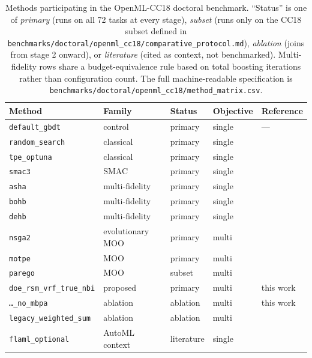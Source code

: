 \begin{table}[t]
  \centering
  \caption{Methods participating in the OpenML-CC18 doctoral
  benchmark. ``Status'' is one of \emph{primary} (runs on all 72
  tasks at every stage), \emph{subset} (runs only on the CC18 subset
  defined in \texttt{benchmarks/doctoral/openml\_cc18/comparative\_protocol.md}),
  \emph{ablation} (joins from stage 2 onward), or \emph{literature}
  (cited as context, not benchmarked). Multi-fidelity rows share a
  budget-equivalence rule based on total boosting iterations rather
  than configuration count. The full machine-readable specification
  is \texttt{benchmarks/doctoral/openml\_cc18/method\_matrix.csv}.}
  \label{tab:methods}
  \small
  \begin{tabular}{lllll}
    \toprule
    Method & Family & Status & Objective & Reference \\
    \midrule
    \texttt{default\_gbdt}                & control          & primary    & single & --- \\
    \texttt{random\_search}               & classical        & primary    & single & \citep{bergstra2012random} \\
    \texttt{tpe\_optuna}                  & classical        & primary    & single & \citep{bergstra2011tpe,akiba2019optuna} \\
    \texttt{smac3}                        & SMAC             & primary    & single & \citep{hutter2011smac,lindauer2022smac3} \\
    \texttt{asha}                          & multi-fidelity   & primary    & single & \citep{li2017hyperband,li2020asha} \\
    \texttt{bohb}                         & multi-fidelity   & primary    & single & \citep{falkner2018bohb} \\
    \texttt{dehb}                         & multi-fidelity   & primary    & single & \citep{awad2021dehb} \\
    \texttt{nsga2}                        & evolutionary MOO & primary    & multi  & \citep{deb2002nsga2,blank2020pymoo} \\
    \texttt{motpe}                        & MOO              & primary    & multi  & \citep{ozaki2020motpe} \\
    \texttt{parego}                       & MOO              & subset     & multi  & \citep{knowles2006parego} \\
    \texttt{doe\_rsm\_vrf\_true\_nbi}     & proposed         & primary    & multi  & this work \\
    \texttt{\ldots\_no\_mbpa}             & ablation         & ablation   & multi  & this work \\
    \texttt{legacy\_weighted\_sum}        & ablation         & ablation   & multi  & \citep{ribeiro2026dissertation} \\
    \texttt{flaml\_optional}              & AutoML context   & literature & single & \citep{wang2021flaml} \\
    \bottomrule
  \end{tabular}
\end{table}


